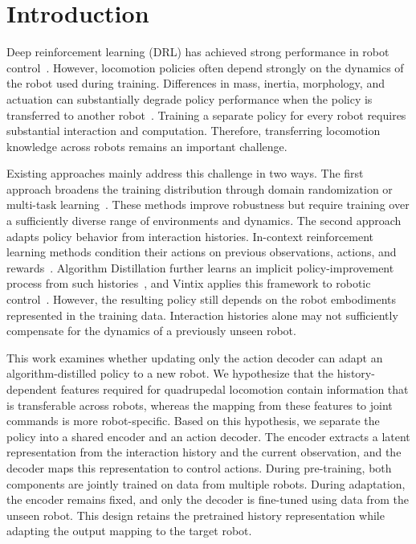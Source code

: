 \documentclass[runningheads]{llncs}
\begin{document}
\section{Introduction}
\label{sec:introduction}

Deep reinforcement learning (DRL) has achieved strong performance in robot control~\cite{annurev:/content/journals/10.1146/annurev-control-030323-022510}. However, locomotion policies often depend strongly on the dynamics of the robot used during training. 
Differences in mass, inertia, morphology, and actuation can substantially degrade policy performance when the policy is transferred to another robot~\cite{9308468,NEURIPS2018_b8cfbf77}.
Training a separate policy for every robot requires
substantial interaction and computation.
Therefore, transferring locomotion knowledge across robots remains an important challenge.


Existing approaches mainly address this challenge in two ways.
The first approach broadens the training distribution through domain randomization or multi-task learning~\cite{8202133,pmlr-v100-yu20a}.
These methods improve robustness but require training over a sufficiently diverse range of environments and dynamics.
The second approach adapts policy behavior from interaction histories.
In-context reinforcement learning methods condition their actions on previous observations, actions, and rewards~\cite{duan2016rl2fastreinforcementlearning,NEURIPS2021_7f489f64}.
Algorithm Distillation further learns an implicit policy-improvement process from such histories~\cite{laskin2022incontextreinforcementlearningalgorithm,zisman2024emergenceincontextreinforcementlearning}, and Vintix applies this framework to robotic control~\cite{polubarov2025vintixactionmodelincontext}.
However, the resulting policy still depends on the robot embodiments represented in the training data. Interaction histories alone may not sufficiently compensate for the dynamics of a previously unseen robot.


This work examines whether updating only the action decoder can adapt an algorithm-distilled policy to a new robot.
We hypothesize that the history-dependent features required for quadrupedal locomotion contain information that is transferable across robots, whereas the mapping from these features to joint commands is more robot-specific. 
Based on this hypothesis, we separate the policy into a shared encoder and an action decoder. 
The encoder extracts a latent representation from the interaction history and the current observation, and the decoder maps this representation to control actions. 
During pre-training, both components are jointly trained on data from multiple robots. 
During adaptation, the encoder remains fixed, and only the decoder is fine-tuned using data from the unseen robot. 
This design retains the pretrained history representation while adapting the output mapping to the target robot.
\end{document}

